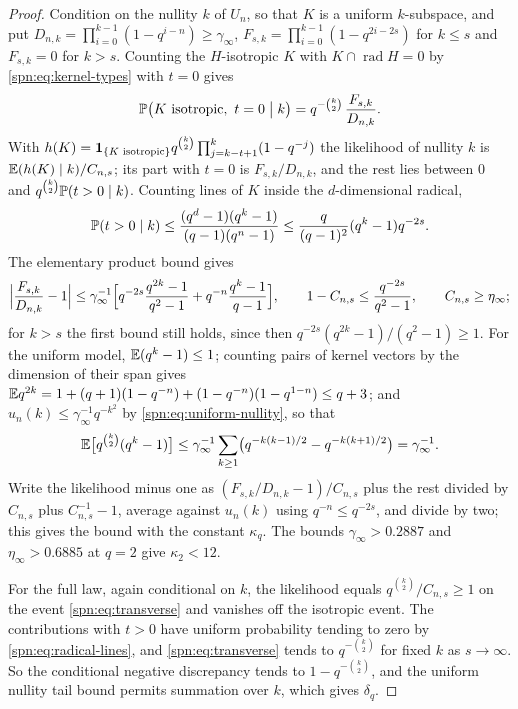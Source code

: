 \begin{proof}
Condition on the nullity $k$ of $U_n$, so that $K$ is a uniform $k$-subspace, and put
$D_{n,k}=\prod_{i=0}^{k-1}(1-q^{i-n})\ge\gamma_\infty$, $F_{s,k}=\prod_{i=0}^{k-1}(1-q^{2i-2s})$ for
$k\le s$ and $F_{s,k}=0$ for $k>s$. Counting the $H$-isotropic $K$ with
$K\cap\operatorname{rad}H=0$ by \eqref{spn:eq:kernel-types} with $t=0$ gives
\begin{equation}\label{spn:eq:transverse}
 \mathbb{P}\bigl(K\text{ isotropic},\ t=0\bigm|k\bigr)=q^{-\binom k2}\,\frac{F_{s,k}}{D_{n,k}} .
\end{equation}
With $h(K)=\mathbf 1_{\{K\text{ isotropic}\}}q^{\binom k2}\prod_{j=k-t+1}^k(1-q^{-j})$ the
likelihood of nullity $k$ is $\mathbb{E}(h(K)\mid k)/C_{n,s}$; its part with $t=0$ is
$F_{s,k}/D_{n,k}$, and the rest lies between $0$ and $q^{\binom k2}\mathbb{P}(t>0\mid k)$. Counting
lines of $K$ inside the $d$-dimensional radical,
\begin{equation}\label{spn:eq:radical-lines}
 \mathbb{P}(t>0\mid k)\le\frac{(q^d-1)(q^k-1)}{(q-1)(q^n-1)}\le\frac{q}{(q-1)^2}(q^k-1)q^{-2s}.
\end{equation}
The elementary product bound gives
\[
 \Bigl|\frac{F_{s,k}}{D_{n,k}}-1\Bigr|\le\gamma_\infty^{-1}\Bigl[q^{-2s}\frac{q^{2k}-1}{q^2-1}
 +q^{-n}\frac{q^k-1}{q-1}\Bigr],\qquad 1-C_{n,s}\le\frac{q^{-2s}}{q^2-1},\qquad
 C_{n,s}\ge\eta_\infty;
\]
for $k>s$ the first bound still holds, since then $q^{-2s}(q^{2k}-1)/(q^2-1)\ge1$. For the
uniform model, $\mathbb{E}(q^k-1)\le1$; counting pairs of kernel vectors by the dimension of their
span gives $\mathbb{E} q^{2k}=1+(q+1)(1-q^{-n})+(1-q^{-n})(1-q^{1-n})\le q+3$; and
$u_n(k)\le\gamma_\infty^{-1}q^{-k^2}$ by \eqref{spn:eq:uniform-nullity}, so that
\[
 \mathbb{E}\bigl[q^{\binom k2}(q^k-1)\bigr]\le\gamma_\infty^{-1}\sum_{k\ge1}
 \bigl(q^{-k(k-1)/2}-q^{-k(k+1)/2}\bigr)=\gamma_\infty^{-1}.
\]
Write the likelihood minus one as $(F_{s,k}/D_{n,k}-1)/C_{n,s}$ plus the rest divided by
$C_{n,s}$ plus $C_{n,s}^{-1}-1$, average against $u_n(k)$ using $q^{-n}\le q^{-2s}$, and divide
by two; this gives the bound with the constant $\kappa_q$. The bounds $\gamma_\infty>0.2887$ and
$\eta_\infty>0.6885$ at $q=2$ give $\kappa_2<12$.

For the full law, again conditional on $k$, the likelihood equals
$q^{\binom k2}/C_{n,s}\ge1$ on the event \eqref{spn:eq:transverse} and vanishes off the
isotropic event. The contributions with $t>0$ have uniform probability tending to zero by
\eqref{spn:eq:radical-lines}, and \eqref{spn:eq:transverse} tends to $q^{-\binom k2}$ for fixed
$k$ as $s\to\infty$. So the conditional negative discrepancy tends to $1-q^{-\binom k2}$, and
the uniform nullity tail bound permits summation over $k$, which gives $\delta_q$.
\end{proof}

